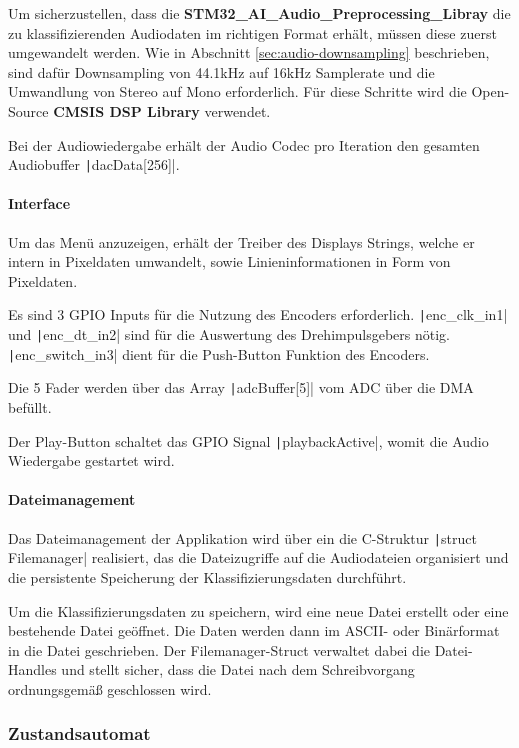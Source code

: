 Um sicherzustellen, dass die \textbf{STM32\_AI\_Audio\_Preprocessing\_Libray} die zu klassifizierenden Audiodaten im richtigen Format erhält, müssen diese zuerst umgewandelt werden. Wie in Abschnitt \ref{sec:audio-downsampling} beschrieben, sind dafür Downsampling von 44.1kHz auf 16kHz Samplerate und die Umwandlung von Stereo auf Mono erforderlich. Für diese Schritte wird die Open-Source \textbf{CMSIS DSP Library} verwendet.

Bei der Audiowiedergabe erhält der Audio Codec pro Iteration den gesamten Audiobuffer \texttt|dacData[256]|.

\paragraph{Interface}

Um das Menü anzuzeigen, erhält der Treiber des Displays Strings, welche er intern in Pixeldaten umwandelt, sowie Linieninformationen in Form von Pixeldaten. 

Es sind 3 GPIO Inputs für die Nutzung des Encoders erforderlich. \texttt|enc_clk_in1| und \texttt|enc_dt_in2| sind für die Auswertung des Drehimpulsgebers nötig. \texttt|enc_switch_in3| dient für die Push-Button Funktion des Encoders.

Die 5 Fader werden über das Array \texttt|adcBuffer[5]| vom ADC über die DMA befüllt.

Der Play-Button schaltet das GPIO Signal \texttt|playbackActive|, womit die Audio Wiedergabe gestartet wird.

\paragraph{Dateimanagement}

Das Dateimanagement der Applikation wird über ein die C-Struktur \texttt|struct Filemanager| realisiert, das die Dateizugriffe auf die Audiodateien organisiert und die persistente Speicherung der Klassifizierungsdaten durchführt.  

Um die Klassifizierungsdaten zu speichern, wird eine neue Datei erstellt oder eine bestehende Datei geöffnet. Die Daten werden dann im ASCII- oder Binärformat in die Datei geschrieben. Der Filemanager-Struct verwaltet dabei die Datei-Handles und stellt sicher, dass die Datei nach dem Schreibvorgang ordnungsgemäß geschlossen wird.

\subsubsection{Zustandsautomat}

